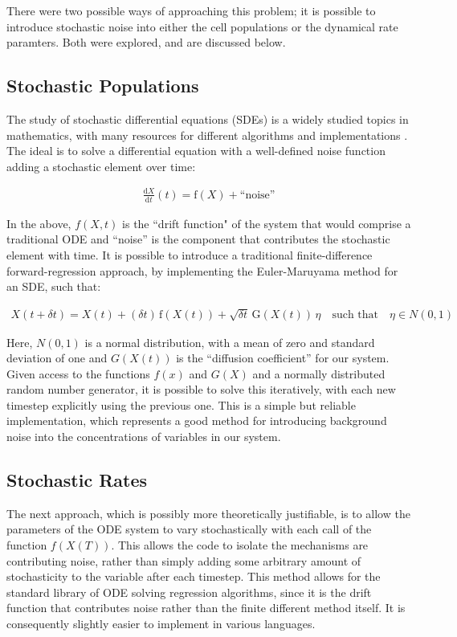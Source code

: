 \documentclass[a4paper, 12pt]{report}
\begin{document}
There were two possible ways of approaching this problem; it is possible to introduce stochastic noise into either the cell populations or the dynamical rate paramters. Both were explored, and are discussed below.

\subsection{Stochastic Populations}

The study of stochastic differential equations (SDEs) is a widely studied topics in mathematics, with many resources for different algorithms and implementations \cite{2001}. The ideal is to solve a differential equation with a well-defined noise function adding a stochastic element over time:

\begin{align}
\frac{\mathrm d X}{\mathrm d t}(t) = \mathrm f (X) + \text{``noise''}
\end{align}

In the above, $f(X,t)$ is the ``drift function" of the system that would comprise a traditional ODE and ``noise'' is the component that contributes the stochastic element with time. It is possible to introduce a traditional finite-difference forward-regression approach, by implementing the Euler-Maruyama method for an SDE, such that:

\begin{align}
\label{eqn:eulerMaruyama}
X(t+\delta t) = X(t) + (\delta t)\, \mathrm f (X(t)) + \sqrt{ \delta t}\, \mathrm G (X(t))\, \eta \quad \text{such that} \quad \eta \in N(0,1)
\end{align}

Here, $N(0,1)$ is a normal distribution, with a mean of zero and standard deviation of one and $G(X(t))$ is the ``diffusion coefficient'' for our system. Given access to the functions $f(x)$ and $G(X)$ and a normally distributed random number generator, it is possible to solve this iteratively, with each new timestep explicitly using the previous one. This is a simple but reliable implementation, which represents a good method for introducing background noise into the concentrations of variables in our system.

\subsection{Stochastic Rates}

The next approach, which is possibly more theoretically justifiable, is to allow the parameters of the ODE system to vary stochastically with each call of the function $f(X(T))$. This allows the code to isolate the mechanisms are contributing noise, rather than simply adding some arbitrary amount of stochasticity to the variable after each timestep. This method allows for the standard library of ODE solving regression algorithms, since it is the drift function that contributes noise rather than the finite different method itself. It is consequently slightly easier to implement in various languages.
\end{document}
